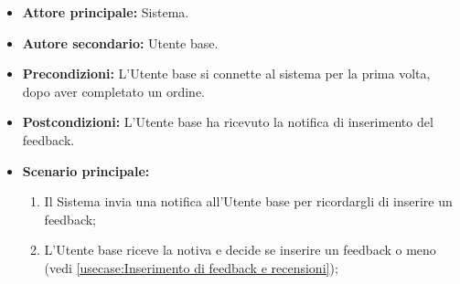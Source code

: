 \label{usecase:Feedback automatico}
\begin{itemize}
	\item \textbf{Attore principale:} Sistema.

	\item \textbf{Autore secondario:} Utente base.

	\item \textbf{Precondizioni:}
	      L'Utente base si connette al sistema per la prima volta, dopo aver
	      completato un ordine.

	\item \textbf{Postcondizioni:}
	      L'Utente base ha ricevuto la notifica di inserimento del feedback.

	\item \textbf{Scenario principale:}
	      \begin{enumerate}
		      \item Il Sistema invia una notifica all'Utente base per
		            ricordargli di inserire un feedback;

		      \item L'Utente base riceve la notiva e decide se inserire un
		            feedback o meno (vedi \autoref{usecase:Inserimento di feedback e
			            recensioni});
	      \end{enumerate}
\end{itemize}
